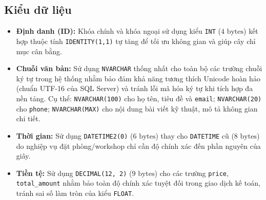 \subsection{Kiểu dữ liệu}
\begin{itemize}
    \item \textbf{Định danh (ID):} Khóa chính và khóa ngoại sử dụng kiểu \texttt{INT} ($4\text{ bytes}$) kết hợp thuộc tính \texttt{IDENTITY(1,1)} tự tăng để tối ưu không gian và giúp cây chỉ mục cân bằng.
    \item \textbf{Chuỗi văn bản:} Sử dụng \texttt{NVARCHAR} thống nhất cho toàn bộ các trường chuỗi ký tự trong hệ thống nhằm bảo đảm khả năng tương thích Unicode hoàn hảo (chuẩn UTF-16 của SQL Server) và tránh lỗi mã hóa ký tự khi tích hợp đa nền tảng. Cụ thể: \texttt{NVARCHAR(100)} cho họ tên, tiêu đề và \texttt{email}; \texttt{NVARCHAR(20)} cho \texttt{phone}; \texttt{NVARCHAR(MAX)} cho nội dung bài viết kỹ thuật, mô tả không gian chi tiết.
    \item \textbf{Thời gian:} Sử dụng \texttt{DATETIME2(0)} ($6\text{ bytes}$) thay cho \texttt{DATETIME} cũ ($8\text{ bytes}$) do nghiệp vụ đặt phòng/workshop chỉ cần độ chính xác đến phần nguyên của giây.
    \item \textbf{Tiền tệ:} Sử dụng \texttt{DECIMAL(12, 2)} ($9\text{ bytes}$) cho các trường \texttt{price}, \texttt{total\_amount} nhằm bảo toàn độ chính xác tuyệt đối trong giao dịch kế toán, tránh sai số làm tròn của kiểu \texttt{FLOAT}.
\end{itemize}

